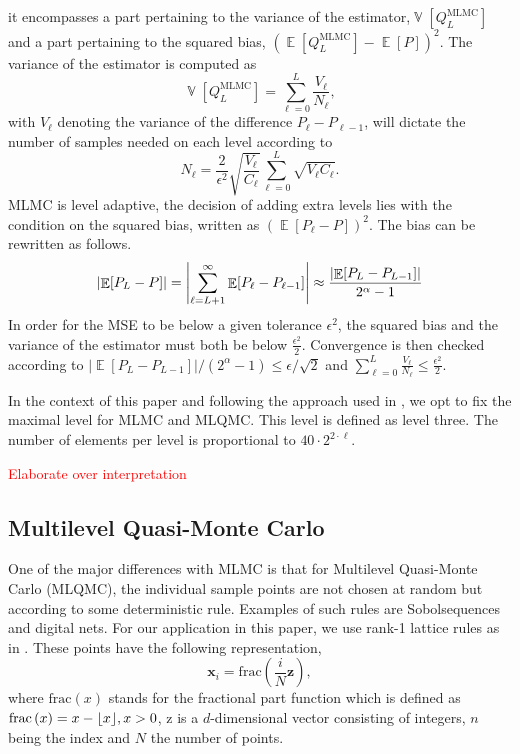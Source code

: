 \documentclass{ICASP13Paper}
\DeclareMathOperator{\E}{\mathbb{E}}
\DeclareMathOperator{\V}{\mathbb{V}}
\newcommand\fracfun[1]{\textrm{frac}\left(#1\right)}
\DeclarePairedDelimiter\floor{\lfloor}{\rfloor}
\begin{document}
it encompasses a part pertaining to the variance of the estimator,$\V\left[Q^{\textrm{MLMC}}_L\right]$ and a part pertaining to the squared bias, $\left(\E\left[Q^{\textrm{MLMC}}_L\right] - \E\left[P\right]\right)^2$. The variance of the estimator is computed as
\begin{equation}
\V[Q^{\textrm{MLMC}}_L] = \sum_{\ell=0}^L \frac{V_{\ell}}{N_{\ell}},
\end{equation}
with $V_{\ell}$ denoting the variance of the difference $P_{\ell} - P_{\ell-1}$, will dictate the number of samples needed on each level according to
\begin{equation}\label{eq:nopt}
 N_\ell = \frac{2}{\epsilon^2} \sqrt{\frac{V_\ell}{C_\ell}} \sum_{\ell=0}^L \sqrt{V_\ell C_\ell} .
\end{equation}
MLMC is level adaptive, the decision of adding extra levels lies with the condition on the squared bias, written as $\left(\E[P_{\ell} - P]\right)^2$. The bias can be rewritten as follows. 
\begin{equation}
\abs{\E[P_L-P]} = \abs{\sum_{\ell=L+1}^{\infty} \E[P_\ell-P_{\ell-1}]} \approx \frac{\abs{\E[P_L-P_{L-1}]}}{2^\alpha-1}
\end{equation}
In order for the MSE to be below a given tolerance $\epsilon^2$, the squared bias and the variance of the estimator must both be below $\frac{\epsilon^2}{2}$. Convergence is then checked according to $|\E[P_L-P_{L-1}]|/(2^\alpha-1)\leq\epsilon/\sqrt{2}$ and  $\sum_{\ell=0}^L \frac{V_{\ell}}{N_{\ell}} \leq \frac{\epsilon^2}{2}$.

In the context of this paper and following the approach used in \cite{Blondeel2}, we opt to fix the maximal level for MLMC and MLQMC. This level is defined as level three. The number of elements per level is proportional to $40 \cdot 2^{2 \cdot \ell}$. 

\textcolor{red}{Elaborate over interpretation}

\subsection{Multilevel Quasi-Monte Carlo}
One of the major differences with MLMC is that for Multilevel Quasi-Monte Carlo (MLQMC), the individual sample points are not chosen at random but according to some deterministic rule. Examples of such rules are Sobol\textquotesingle sequences and digital nets. For our application in this paper, we use rank-1 lattice rules as in \cite{Giles3}. These points have the following representation,
\begin{equation}
\mathbf{x}_i = \fracfun{\frac{i}{N}\mathbf{z}},
\label{eq:QMC_points_no_shift}
\end{equation}
where $\fracfun{x}$ stands for the fractional part function which is defined as $\fracfun{x} = x - \floor{x}, x>0$, $\mathrm{z}$ is a $d$-dimensional vector consisting of integers, $n$ being the index and $N$ the number of points.
\end{document}

